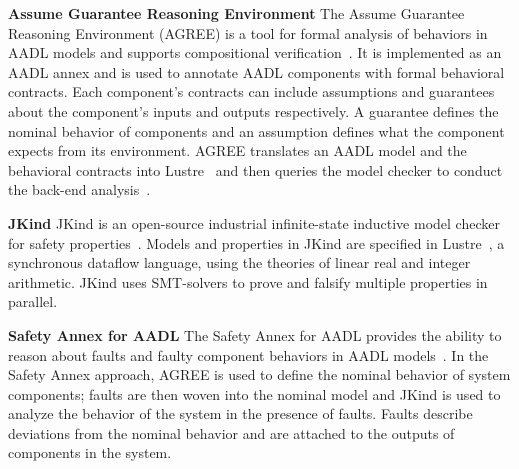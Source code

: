 \textbf{Assume Guarantee Reasoning Environment}
The Assume Guarantee Reasoning Environment (AGREE) is a tool for formal analysis of behaviors in AADL models and supports compositional verification~\cite{NFM2012:CoGaMiWhLaLu}.  It is implemented as an AADL annex and is used to annotate AADL components with formal behavioral contracts. Each component's contracts can include assumptions and guarantees about the component's inputs and outputs respectively. A guarantee defines the nominal behavior of components and an assumption defines what the component expects from its environment. AGREE translates an AADL model and the behavioral contracts into Lustre~\cite{Halbwachs91:IEEE} and then queries the \jkind model checker to conduct the back-end analysis~\cite{2017arXiv171201222G}. 

\textbf{JKind}
JKind is an open-source industrial infinite-state
inductive model checker for safety properties~\cite{2017arXiv171201222G}. Models and properties in JKind are specified in Lustre~\cite{Halbwachs91:IEEE}, a synchronous dataflow language, using the theories of linear real and integer arithmetic. JKind uses SMT-solvers to prove and falsify multiple properties in parallel.

\textbf{Safety Annex for AADL}
The Safety Annex for AADL provides the ability to reason about faults and faulty component behaviors in AADL models~\cite{Stewart17:IMBSA,stewart2020safety}. In the Safety Annex approach, AGREE is used to define the nominal behavior of system components; faults are then woven into the nominal model and JKind is used to analyze the behavior of the system in the presence of faults. Faults describe deviations from the nominal behavior and are attached to the outputs of components in the system.%
